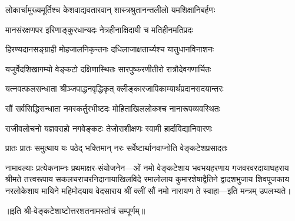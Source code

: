 \twolineshloka
{लोकार्चामुख्यमूर्तिश्च केशवाद्यवतारवान्}
{शास्त्रश्रुतानन्तलीलो यमशिक्षानिबर्हणः}

\twolineshloka
{मानसंरक्षणपर इरिणाङ्कुरधान्यदः}
{नेत्रहीनाक्षिदायी च मतिहीनमतिप्रदः}

\twolineshloka
{हिरण्यदानसङ्ग्राही मोहजालनिकृन्तनः}
{दधिलाजाक्षतार्च्यश्च यातुधानविनाशनः}

\twolineshloka
{यजुर्वेदशिखागम्यो वेङ्कटो दक्षिणास्थितः}
{सारपुष्करणीतीरो रात्रौदेवगणार्चितः}

\twolineshloka
{यत्नवत्फलसन्धाता श्रीञ्जपाद्धनवृद्धिकृत्}
{क्लीङ्कारजापिकाम्यार्थप्रदानसदयान्तरः}

\twolineshloka
{सौं सर्वसिद्धिसन्धाता नमस्कर्तुरभीष्टदः}
{मोहिताखिललोकश्च नानारूपव्यवस्थितः}

\twolineshloka
{राजीवलोचनो यज्ञवराहो नगवेङ्कटः} %
{तेजोराशीक्षणः स्वामी हार्दाविद्यानिवारणः}

{प्रातः प्रातः  समुत्थाय  यः  पठेद् भक्तिमान् नरः}
{सर्वेष्टार्थानवाप्नोति  वेङ्कटेशप्रसादतः}

नामावल्याः प्रत्येकनाम्नः प्रथमाक्षर-संयोजनेन---ओं नमो वेङ्कटेशाय
भवभयहरणाय
गजवरवरदायाघहराय
श्रीमते तत्त्वरूपाय
सकलचराचरनिदानायाखिलविदे
रमालोलाय
कुमारशेषाद्वैतिने
द्वादशभुजाय
शिवपूजकाय
नरलोकेशाय
मायिने
महिमोदयाय
वेदसाराय
श्रीं क्लीं सौं
नमो नारायण ते स्वाहा---इति मन्त्रम् उपलभ्यते।

॥इति श्री-वेङ्कटेशाष्टोत्तरशतनामस्तोत्रं सम्पूर्णम्॥